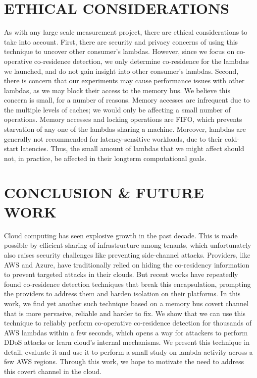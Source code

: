 
\section{ETHICAL CONSIDERATIONS}
As with any large scale measurement project, there are ethical considerations to
take into account. First, there are security and privacy concerns of using this
technique to uncover other consumer's lambdas. However, since we focus on
co-operative co-residence detection, we only determine co-residence for the
lambdas we launched, and do not gain insight into other consumer's lambdas.
Second, there is concern that our experiments may cause performance issues
with other lambdas, as we may block their access to the memory bus. We believe
this concern is small, for a number of reasons. Memory accesses are infrequent
due to the multiple levels of caches; we would only be affecting a small number
of operations. Memory accesses and locking operations are FIFO, which
prevents starvation of any one of the lambdas sharing a machine. Moreover,
lambdas are generally not recommended for latency-sensitive workloads, due to
their cold-start latencies. Thus, the small amount of lambdas that we might
affect should not, in practice, be affected in their longterm computational
goals. 


\section{CONCLUSION \& FUTURE WORK}
\label{sec:conclusion}
Cloud computing has seen explosive growth in the past decade. This is made
possible by efficient sharing of infrastructure among tenants, which
unfortunately also raises security challenges like preventing side-channel
attacks. Providers, like AWS and Azure, have traditionally relied on hiding the
co-residency information to prevent targeted attacks in their clouds. But recent
works have repeatedly found co-residence detection techniques that break this
encapsulation, prompting the providers to address them and harden isolation on
their platforms. In this work, we find yet another such technique based on a
memory bus covert channel that is more pervasive, reliable and harder to fix. We
show that we can use this technique to reliably perform co-operative
co-residence detection for thousands of AWS lambdas within a few seconds, which
opens a way for attackers to perform DDoS attacks or learn cloud's internal
mechanisms. We present this technique in detail, evaluate it and use it to
perform a small study on lambda activity across a few AWS regions.  Through this
work, we hope to motivate the need to address this covert channel in the cloud.

